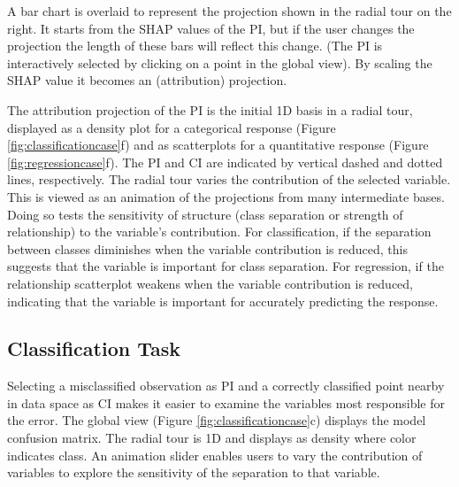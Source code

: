 \documentclass[
]{jss}
\begin{document}
A bar chart is overlaid to represent the projection shown in the radial
tour on the right. It starts from the SHAP values of the PI, but if the
user changes the projection the length of these bars will reflect this
change. (The PI is interactively selected by clicking on a point in the
global view). By scaling the SHAP value it becomes an (attribution)
projection.

The attribution projection of the PI is the initial 1D basis in a radial
tour, displayed as a density plot for a categorical response (Figure
\ref{fig:classificationcase}f) and as scatterplots for a quantitative
response (Figure \ref{fig:regressioncase}f). The PI and CI are indicated
by vertical dashed and dotted lines, respectively. The radial tour
varies the contribution of the selected variable. This is viewed as an
animation of the projections from many intermediate bases. Doing so
tests the sensitivity of structure (class separation or strength of
relationship) to the variable's contribution. For classification, if the
separation between classes diminishes when the variable contribution is
reduced, this suggests that the variable is important for class
separation. For regression, if the relationship scatterplot weakens when
the variable contribution is reduced, indicating that the variable is
important for accurately predicting the response.

\hypertarget{classification-task}{%
\subsection{Classification Task}\label{classification-task}}

Selecting a misclassified observation as PI and a correctly classified
point nearby in data space as CI makes it easier to examine the
variables most responsible for the error. The global view (Figure
\ref{fig:classificationcase}c) displays the model confusion matrix. The
radial tour is 1D and displays as density where color indicates class.
An animation slider enables users to vary the contribution of variables
to explore the sensitivity of the separation to that variable.
\end{document}
